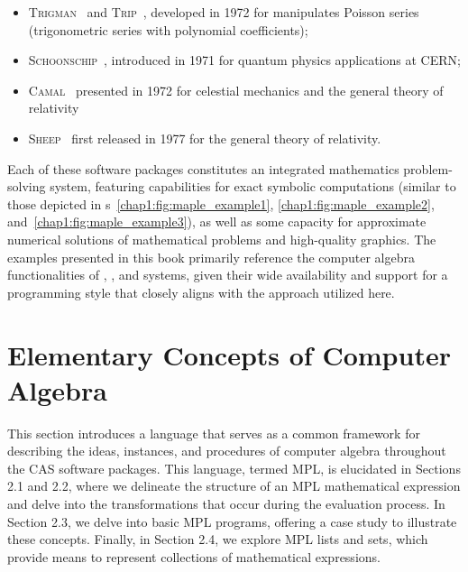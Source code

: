 %
\begin{itemize}
  \setlength{\itemsep}{0.0em}
  \item \textsc{Trigman}~\cite{jeffreys1972trigman} and \textsc{Trip}~\cite{gastineau2011trip}, developed in 1972 for manipulates Poisson series (trigonometric series with polynomial coefficients);
  \item \textsc{Schoonschip}~\cite{strubbe1974presentation}, introduced in 1971 for quantum physics applications at \ac{CERN};
  \item \textsc{Camal}~\cite{bourne1972camal} presented in 1972 for celestial mechanics and the general theory of relativity
  \item \textsc{Sheep}~\cite{frick1977computer} first released in 1977 for the general theory of relativity.
\end{itemize}
%
Each of these software packages constitutes an integrated mathematics problem-solving system, featuring capabilities for exact symbolic computations (similar to those depicted in \figurename{}s~\ref{chap1:fig:maple_example1}, \ref{chap1:fig:maple_example2}, and~\ref{chap1:fig:maple_example3}), as well as some capacity for approximate numerical solutions of mathematical problems and high-quality graphics. The examples presented in this book primarily reference the computer algebra functionalities of \Maple{}, \Mathematica{}, and \MuPAD{} systems, given their wide availability and support for a programming style that closely aligns with the approach utilized here.


\section{Elementary Concepts of Computer Algebra}

This section introduces a language that serves as a common framework for describing the ideas, instances, and procedures of computer algebra throughout the \ac{CAS} software packages. This language, termed \ac{MPL}, is elucidated in Sections 2.1 and 2.2, where we delineate the structure of an \ac{MPL} mathematical expression and delve into the transformations that occur during the evaluation process. In Section 2.3, we delve into basic \ac{MPL} programs, offering a case study to illustrate these concepts. Finally, in Section 2.4, we explore \ac{MPL} lists and sets, which provide means to represent collections of mathematical expressions.

